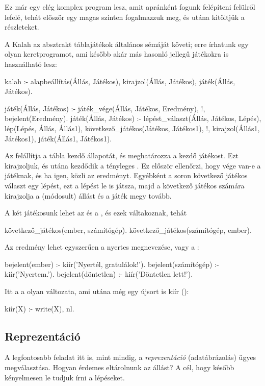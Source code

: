 Ez már egy elég komplex program lesz, amit apránként
fogunk felépíteni felülről lefelé, tehát először
egy magas szinten fogalmazzuk meg, és utána
kitöltjük a részleteket.

A Kalah az absztrakt táblajátékok általános sémáját
követi; erre írhatunk egy olyan keretprogramot, ami
később akár más hasonló jellegű játékokra is
használható lesz:
\begin{program}
kalah :-
    alapbeállítás(Állás, Játékos),
    kirajzol(Állás, Játékos),
    játék(Állás, Játékos).

játék(Állás, Játékos) :-
    játék_vége(Állás, Játékos, Eredmény), !,
    bejelent(Eredmény).
játék(Állás, Játékos) :-
    lépést_választ(Állás, Játékos, Lépés),
    lép(Lépés, Állás, Állás1),
    következő_játékos(Játékos, Játékos1), !,
    kirajzol(Állás1, Játékos1),
    játék(Állás1, Játékos1).
\end{program}

Az  felállítja a tábla kezdő
állapotát, és meghatározza a kezdő játékost. Ezt
kirajzoljuk, és utána kezdődik a tényleges
. Ez először ellenőrzi, hogy vége van-e
a játéknak, és ha igen, közli az
eredményt. Egyébként a soron következő játékos
választ egy lépést, ezt a lépést le is játsza, majd
a következő játékos számára kirajzolja a (módosult)
állást és a játék megy tovább.

A két játékosunk lehet az  és a
, és ezek váltakoznak, tehát
\begin{program}
következő_játékos(ember, számítógép).
következő_játékos(számítógép, ember).
\end{program}

Az eredmény lehet egyszerűen a nyertes megnevezése,
vagy a :
\begin{program}
bejelent(ember) :- kiír('Nyertél, gratulálok!').
bejelent(számítógép) :- kiír('Nyertem.').
bejelent(döntetlen) :- kiír('Döntetlen lett!').
\end{program}

Itt a  a  olyan változata, ami
utána még egy újsort is kiír ():
\begin{program}
kiír(X) :- write(X), nl.
\end{program}

\subsection*{Reprezentáció}
A legfontosabb feladat itt is, mint mindig, a
\emph{reprezentáció} (adatábrázolás) ügyes
megválasztása. Hogyan érdemes eltárolnunk az állást?
A cél, hogy később kényelmesen le tudjuk írni a
lépéseket.

